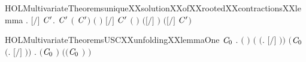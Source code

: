 \begin{SaveVerbatim}{HOLMultivariateTheoremsuniqueXXsolutionXXofXXrootedXXcontractionsXXlemma}
           \HOLSymConst{\HOLTokenForall{}}.
               \ensuremath{[}\ensuremath{/}\ensuremath{]}  \HOLTokenWeakTransBegin\HOLConst{\ensuremath{\tau}}\HOLTokenWeakTransEnd {} \HOLSymConst{\HOLTokenImp{}}
               \HOLSymConst{\HOLTokenExists{}}\ensuremath{\HOLBoundVar{C}\sp{\prime}}.
                     \ensuremath{\HOLBoundVar{C}\sp{\prime}} \HOLSymConst{\HOLTokenConj{}}  \ensuremath{(} \ensuremath{\HOLBoundVar{C}\sp{\prime}}\ensuremath{)} \ensuremath{(} \ensuremath{)} \HOLSymConst{\HOLTokenConj{}}
                     \ensuremath{[}\ensuremath{/}\ensuremath{]} \ensuremath{\HOLBoundVar{C}\sp{\prime}} \HOLSymConst{\HOLTokenConj{}}
                   \ensuremath{(}  \ensuremath{)} \ensuremath{(}\ensuremath{[}\ensuremath{/}\ensuremath{]} \ensuremath{)} \ensuremath{(}\ensuremath{[}\ensuremath{/}\ensuremath{]} \ensuremath{\HOLBoundVar{C}\sp{\prime}}\ensuremath{)}
\end{SaveVerbatim}
\newcommand{\HOLMultivariateTheoremsuniqueXXsolutionXXofXXrootedXXcontractionsXXlemma}{\UseVerbatim{HOLMultivariateTheoremsuniqueXXsolutionXXofXXrootedXXcontractionsXXlemma}}
\begin{SaveVerbatim}{HOLMultivariateTheoremsUSCXXunfoldingXXlemmaOne}
\HOLTokenTurnstile{} \HOLSymConst{\HOLTokenForall{}}   \ensuremath{\HOLBoundVar{C}\sb{\mathrm{0}}} .
          \HOLSymConst{\HOLTokenConj{}}  \ensuremath{(} \ensuremath{)}  \HOLSymConst{\HOLTokenConj{}}
            \HOLSymConst{\HOLTokenConj{}}    \HOLSymConst{\HOLTokenConj{}}
       \ensuremath{(} \HOLSymConst{\ensuremath{=}} \ensuremath{(}\HOLTokenLambda{}.  \ensuremath{[}\ensuremath{/}\ensuremath{]} \ensuremath{)}\ensuremath{)} \HOLSymConst{\HOLTokenConj{}} \ensuremath{(}\ensuremath{\HOLBoundVar{C}\sb{\mathrm{0}}} \HOLSymConst{\ensuremath{=}} \ensuremath{(}\HOLTokenLambda{}. \ensuremath{[}\ensuremath{/}\ensuremath{]} \ensuremath{)}\ensuremath{)} \HOLSymConst{\HOLTokenImp{}}
       \HOLSymConst{\HOLTokenForall{}}.  \ensuremath{(}\ensuremath{\HOLBoundVar{C}\sb{\mathrm{0}}} \ensuremath{)} \ensuremath{(}\ensuremath{(}\ensuremath{\HOLBoundVar{C}\sb{\mathrm{0}}} \HOLConst{\HOLTokenCompose}   \ensuremath{)} \ensuremath{)}
\end{SaveVerbatim}
